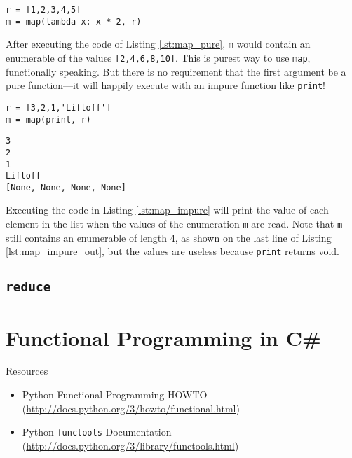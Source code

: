 \documentclass[ignorenonframetext,red]{beamer}
\begin{document}
\begin{frame}[fragile]
\begin{lstlisting}[style=python,caption={Doubling Each Element},label={lst:map_pure}]
r = [1,2,3,4,5]
m = map(lambda x: x * 2, r)
\end{lstlisting}
\end{frame}

\noindent After executing the code of Listing \ref{lst:map_pure}, \texttt{m} would contain an enumerable of the values \texttt{[2,4,6,8,10]}. This is purest way to use \texttt{map}, functionally speaking. But there is no requirement that the first argument be a pure function---it will happily execute with an impure function like \texttt{print}!

\begin{frame}[fragile]
\begin{lstlisting}[style=python,caption={\texttt{map} With an Impure Function},label={lst:map_impure}]
r = [3,2,1,'Liftoff']
m = map(print, r)
\end{lstlisting}
\end{frame}

\begin{lstlisting}[style=python,caption={Output of Listing \ref{lst:map_impure}},label={lst:map_impure_out}]
3
2
1
Liftoff
[None, None, None, None]
\end{lstlisting}

\noindent Executing the code in Listing \ref{lst:map_impure} will print the value of each element in the list when the values of the enumeration \texttt{m} are read. Note that \texttt{m} still contains an enumerable of length 4, as shown on the last line of Listing \ref{lst:map_impure_out}, but the values are useless because \texttt{print} returns void.

\subsection{\tt reduce}



\section{Functional Programming in C\#}
\begin{frame}
\end{frame}

\begin{frame}{Resources}
\begin{itemize}
	\item Python Functional Programming HOWTO\\(\url{http://docs.python.org/3/howto/functional.html})
	\item Python {\tt functools} Documentation\\(\url{http://docs.python.org/3/library/functools.html})
\end{itemize}
\end{frame}
\end{document}
